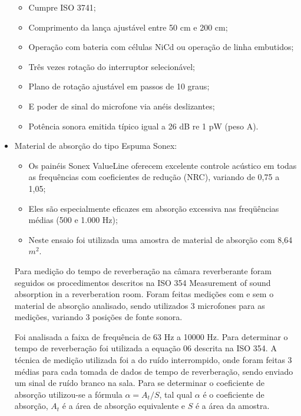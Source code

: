 \begin{itemize}
		\begin{itemize}
			\item Cumpre ISO 3741;
			\item Comprimento da lança ajustável entre 50 cm e 200 cm;
			\item Operação com bateria com células NiCd ou operação de linha embutidos;
			\item Três vezes rotação do interruptor selecionável;
			\item Plano de rotação ajustável em passos de 10 graus;
			\item E poder de sinal do microfone via anéis deslizantes;
			\item Potência sonora emitida típico igual a 26 dB re 1 pW (peso A).
		\end{itemize}

	\item Material de absorção do tipo Espuma Sonex: 
		\begin{itemize}
			\item Os painéis Sonex ValueLine oferecem excelente controle acústico em todas as frequências com coeficientes de redução (NRC), variando de 0,75 a 1,05;
			\item Eles são especialmente eficazes em absorção excessiva nas freqüências médias (500 e 1.000 Hz);
			\item Neste ensaio foi utilizada uma amostra de material de absorção com 8,64 $m^{2}$.
		\end{itemize}

	Para medição do tempo de reverberação na câmara reverberante foram seguidos os procedimentos descritos na ISO 354 Measurement of sound absorption in a reverberation room. Foram feitas medições com e sem o material de absorção analisado, sendo utilizados 3 microfones para as medições, variando 3 posições de fonte sonora.

	Foi analisada a faixa de frequência de 63 Hz a 10000 Hz. Para determinar o tempo de reverberação foi utilizada a equação 06 descrita na ISO 354. A técnica de medição utilizada foi a do ruído interrompido, onde foram feitas 3 médias para cada tomada de dados de tempo de reverberação, sendo enviado um sinal de ruído branco na sala. Para se determinar o coeficiente de absorção utilizou-se a fórmula $\alpha = A_{t}/S$, tal qual $\alpha$ é o coeficiente de absorção, $A_{t}$ é a área de absorção equivalente e $S$ é a área da amostra.		

\end{itemize}

